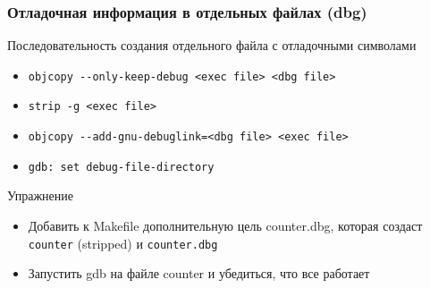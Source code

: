 \begin{frame}[fragile]
  \frametitle{Отладочная информация в отдельных файлах (dbg)}
  \begin{center}
    Последовательность создания отдельного файла с отладочными символами
  \end{center}
  \begin{itemize}
    \item \texttt{objcopy -{}-only-keep-debug <exec file> <dbg file>}
    \item \texttt{strip -g <exec file>}
    \item \texttt{objcopy -{}-add-gnu-debuglink=<dbg file> <exec file>}
    \item \texttt{gdb: set debug-file-directory}
  \end{itemize}
\pause
  \begin{center}
   Упражнение
  \end{center}
  \begin{itemize}
    \item Добавить к Makefile дополнительную цель counter.dbg, которая создаст \texttt{counter} (stripped) и \texttt{counter.dbg}
    \item Запустить gdb на файле counter и убедиться, что все работает
  \end{itemize}
\end{frame}
